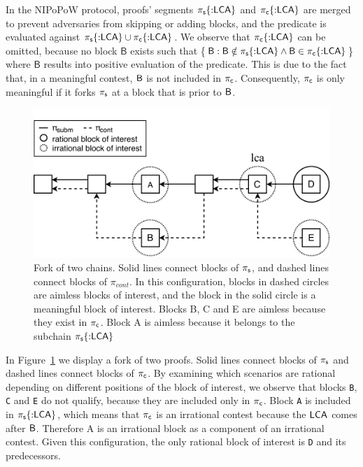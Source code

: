 \newcommand{\block}{\mathsf{B}}

In the NIPoPoW protocol, proofs' segments $\mathsf{\pi_{s}}\{{{:}}\mathsf{LCA}\}$ and
$\mathsf{\pi_{c}}\{{:}\mathsf{LCA}\}$ are merged to prevent adversaries from skipping or adding
blocks, and the predicate is evaluated against $\mathsf{\pi_{s}}\{{:}\mathsf{LCA}\} \cup
\mathsf{\pi_{c}}\{{:}\mathsf{LCA}\}$. We observe that $\mathsf{\pi_{c}}\{{:}\mathsf{LCA}\}$ can be omitted, because no
block $\block$ exists such that \{$\block : \block \notin \pis\{{:}\lca\} \land
\block \in \pic\{{:}\lca\}$\} where $\block$ results into positive evaluation
of the predicate. This is due to the fact that, in a meaningful contest, $\mathsf{B}$
is not included in $\mathsf{\pi_{c}}$. Consequently, $\mathsf{\pi_{c}}$ is only meaningful if it forks
$\mathsf{\pi_{s}}$ at a block that is prior to $\mathsf{B}$.

\renewcommand{\block}{}

\begin{figure}[h]
    \begin{center}
        \includegraphics[width=1\columnwidth]{figures/boi-position.pdf}
    \end{center}
    \caption{Fork of two chains. Solid lines connect blocks of $\mathsf{\pi_{s}}$,
    and dashed lines connect blocks of $\pi_{cont}$. In this configuration,
    blocks in dashed circles are aimless blocks of interest, and the block
    in the solid circle is a meaningful block of interest. Blocks B, C and E are
    aimless because they exist in $\mathsf{\pi_{c}}$. Block A is aimless because it
    belongs to the subchain $\mathsf{\pi_{s}}\{{:}\mathsf{LCA}\}$}
    \label{fig:boi-position}
\end{figure}

In Figure~\ref{fig:boi-position} we display a fork of two proofs. Solid lines
connect blocks of $\mathsf{\pi_{s}}$ and dashed lines connect blocks of $\mathsf{\pi_{c}}$. By
examining which scenarios are rational depending on different positions of the
block of interest, we observe that blocks \texttt{B}, \texttt{C} and \texttt{E}
do not qualify, because they are included only in $\mathsf{\pi_{c}}$. Block \texttt{A} is
included in $\mathsf{\pi_{s}}\{{:}\mathsf{LCA}\}$, which means that $\mathsf{\pi_{c}}$ is an irrational contest
because the $\mathsf{LCA}$ comes after $\mathsf{B}$. Therefore A is an irrational block as a
component of an irrational contest. Given this configuration, the only rational
block of interest is \texttt{D} and its predecessors.

